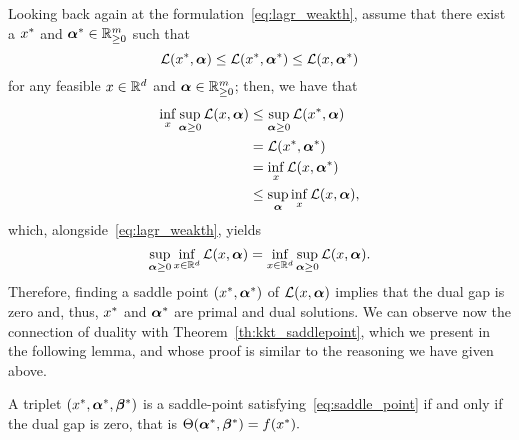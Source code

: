 Looking back again at the formulation~\eqref{eq:lagr_weakth}, assume that there exist a ${x}^*$ and ${\bm{\alpha}}^* \in \mathbb{R}_{\geq 0}^{m}$ such that 
\begin{equation}
    \nonumber
    \mathcal{L}({x}^*, \bm{\alpha}) \leq \mathcal{L}({x}^*, {\bm{\alpha}}^*) \leq \mathcal{L}(x, {\bm{\alpha}}^*)
\end{equation}
for any feasible $x \in \mathbb{R}^d$ and $\bm{\alpha} \in  \mathbb{R}_{\geq 0}^m$; then, we have that 
\begin{equation}
    \nonumber
    \begin{aligned}
        \inf_{x} \sup_{\bm{\alpha} \geq 0} \mathcal{L}(x, \bm{\alpha}) &\leq \sup_{\bm{\alpha} \geq 0} \mathcal{L}({x}^*, \bm{\alpha}) \\
        & = \mathcal{L}({x}^*, {\bm{\alpha}}^*) \\
        & = \inf_{x} \mathcal{L}(x, {\bm{\alpha}}^*) \\
        & \leq \sup_{\bm{\alpha}} \inf_{x} \mathcal{L}(x, \bm{\alpha}), 
    \end{aligned}
\end{equation}
which, alongside~\eqref{eq:lagr_weakth}, yields 
\begin{equation}
    \label{eq:lagr_strongth}
    \sup_{\fv{\alpha} \geq 0} \inf_{x \in \vecspace} \lagr(x, \fv{\alpha}) = \inf_{x \in \vecspace} \sup_{\fv{\alpha} \geq 0} \lagr(x, \fv{\alpha}).
\end{equation}
Therefore, finding a saddle point $({x}^*, {\bm{\alpha}}^*)$ of $\mathcal{L}(x, \bm{\alpha})$ implies that the dual gap is zero and, thus, ${x}^*$ and ${\bm{\alpha}}^*$ are primal and dual solutions.
%
We can observe now the connection of duality with Theorem~\ref{th:kkt_saddlepoint}, which we present in the following lemma, and whose proof is similar to the reasoning we have given above.
\begin{lemma}
    A triplet $({x}^*, {\bm{\alpha}}^*, {\bm{\beta}}^*)$ is a saddle-point satisfying~\eqref{eq:saddle_point} if and only if the dual gap is zero, that is 
    $ \Theta({\bm{\alpha}}^*, {\bm{\beta}}^*) = f({x}^*) .$
\end{lemma}

